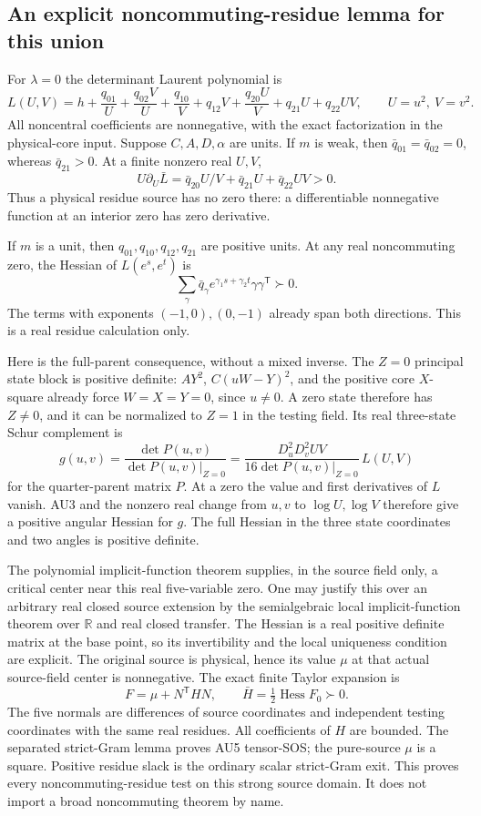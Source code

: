 \subsection{An explicit noncommuting-residue lemma for this union}

For \(\lambda=0\) the determinant Laurent polynomial is
\[
 L(U,V)=h+\frac{q_{01}}U+\frac{q_{02}V}U+\frac{q_{10}}V
       +q_{12}V+\frac{q_{20}U}V+q_{21}U+q_{22}UV ,
 \qquad U=u^2,\ V=v^2.
 \tag{AU1}
\]
All noncentral coefficients are nonnegative, with the exact
factorization in the physical-core input.
Suppose \(C,A,D,\alpha\) are units.
If \(m\) is weak, then \(\bar q_{01}=\bar q_{02}=0\), whereas
\(\bar q_{21}>0\). At a finite nonzero real \(U,V\),
\[
 U\partial_U\bar L
   =\bar q_{20}U/V+\bar q_{21}U+\bar q_{22}UV>0.
 \tag{AU2}
\]
Thus a physical residue source has no zero there:
a differentiable nonnegative function at an interior zero
has zero derivative.

If \(m\) is a unit, then \(q_{01},q_{10},q_{12},q_{21}\) are
positive units. At any real noncommuting zero, the Hessian of
\(L(e^s,e^t)\) is
\[
 \sum_{\gamma} \bar q_\gamma
             e^{\gamma_1s+\gamma_2t}\gamma\gamma^{\mathsf T}
 \succ0 .
 \tag{AU3}
\]
The terms with exponents \((-1,0),(0,-1)\) already span both
directions. This is a real residue calculation only.

Here is the full-parent consequence, without a mixed inverse.
The \(Z=0\) principal state block is positive definite:
\(A Y^2\), \(C(uW-Y)^2\), and the positive core \(X\)-square
already force \(W=X=Y=0\), since \(u\ne0\).
A zero state therefore has \(Z\ne0\), and it can be normalized
to \(Z=1\) in the testing field. Its real three-state Schur
complement is
\[
 g(u,v)=\frac{\det P(u,v)}
                 {\det P(u,v)|_{Z=0}}
 =\frac{D_u^2D_v^2UV}{16\det P(u,v)|_{Z=0}}\,L(U,V)
 \tag{AU4}
\]
for the quarter-parent matrix \(P\).
At a zero the value and first derivatives of \(L\) vanish.
AU3 and the nonzero real change from \(u,v\) to \(\log U,\log V\)
therefore give a positive angular Hessian for \(g\).
The full Hessian in the three state coordinates and two angles
is positive definite.

The polynomial implicit-function theorem supplies, in the source
field only, a critical center near this real five-variable zero.
One may justify this over an arbitrary real closed source extension
by the semialgebraic local implicit-function theorem over
\(\mathbb R\) and real closed transfer. The Hessian is a real
positive definite matrix at the base point, so its invertibility
and the local uniqueness condition are explicit.
The original source is physical, hence its value \(\mu\) at
that actual source-field center is nonnegative.
The exact finite Taylor expansion is
\[
 F=\mu+N^{\mathsf T}HN,\qquad
 \bar H=\tfrac12\operatorname{Hess}F_0\succ0 .
 \tag{AU5}
\]
The five normals are differences of source coordinates and
independent testing coordinates with the same real residues.
All coefficients of \(H\) are bounded. The separated strict-Gram
lemma proves AU5 tensor-SOS; the pure-source \(\mu\) is a square.
Positive residue slack is the ordinary scalar strict-Gram exit.
This proves every noncommuting-residue test on this strong source
domain. It does not import a broad noncommuting theorem by name.

